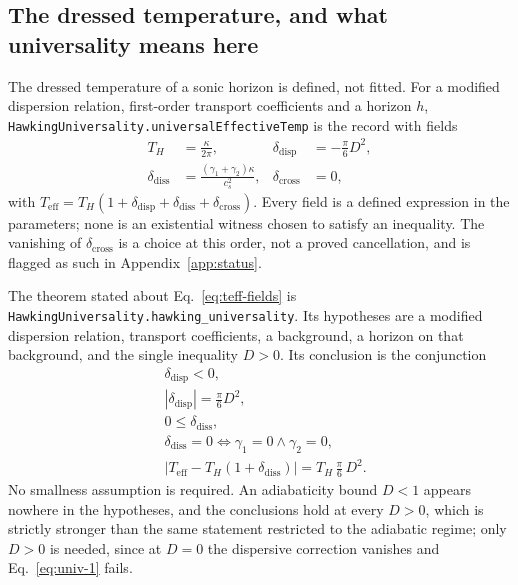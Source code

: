 \documentclass[aps,prd,reprint,nofootinbib,superscriptaddress]{revtex4-2}
\begin{document}
\subsection{The dressed temperature, and what universality means here}
\label{sec:eft-universality}

The dressed temperature of a sonic horizon is defined, not fitted. For a
modified dispersion relation, first-order transport coefficients and a
horizon $h$, \texttt{HawkingUniversality.universalEffectiveTemp} is the
record with fields
\begin{equation}
\label{eq:teff-fields}
\begin{aligned}
T_H &= \frac{\kappa}{2\pi}, &
\delta_{\mathrm{disp}} &= -\frac{\pi}{6}D^{2},\\
\delta_{\mathrm{diss}} &= \frac{(\gamma_1+\gamma_2)\kappa}{c_s^{2}}, &
\delta_{\mathrm{cross}} &= 0,
\end{aligned}
\end{equation}
with $T_{\mathrm{eff}} = T_H(1 + \delta_{\mathrm{disp}}
+ \delta_{\mathrm{diss}} + \delta_{\mathrm{cross}})$. Every field is a
defined expression in the parameters; none is an existential witness
chosen to satisfy an inequality. The vanishing of
$\delta_{\mathrm{cross}}$ is a choice at this order, not a proved
cancellation, and is flagged as such in Appendix~\ref{app:status}.

The theorem stated about Eq.~\eqref{eq:teff-fields} is
\texttt{HawkingUniversality.hawking\_universality}. Its hypotheses are a
modified dispersion relation, transport coefficients, a background, a
horizon on that background, and the single inequality $D > 0$. Its
conclusion is the conjunction
\begin{align}
&\delta_{\mathrm{disp}} < 0, \label{eq:univ-1}\\
&|\delta_{\mathrm{disp}}| = \tfrac{\pi}{6}D^{2}, \label{eq:univ-2}\\
&0 \leq \delta_{\mathrm{diss}}, \label{eq:univ-3}\\
&\delta_{\mathrm{diss}} = 0 \iff \gamma_1 = 0 \wedge \gamma_2 = 0,
   \label{eq:univ-4}\\
&\big|T_{\mathrm{eff}} - T_H(1+\delta_{\mathrm{diss}})\big|
   = T_H\,\tfrac{\pi}{6}\,D^{2}. \label{eq:univ-5}
\end{align}
No smallness assumption is required. An adiabaticity bound $D < 1$
appears nowhere in the hypotheses, and the conclusions hold at every
$D > 0$, which is strictly stronger than the same statement restricted to
the adiabatic regime; only $D > 0$ is needed, since at $D = 0$ the
dispersive correction vanishes and Eq.~\eqref{eq:univ-1} fails.
\end{document}
